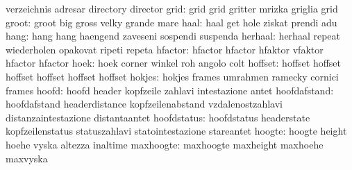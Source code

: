                            verzeichnis               adresar
                           directory                 director
                     grid: grid                      grid
                           gritter                   mrizka
                           griglia                   grid
                    groot: groot                     big
                           gross                     velky
                           grande                    mare
                     haal: haal                      get
                           hole                      ziskat
                           prendi                    adu
                     hang: hang                      hang
                           haengend                  zaveseni
                           sospendi                  suspenda
                  herhaal: herhaal                   repeat
                           wiederholen               opakovat
                           ripeti                    repeta
                  hfactor: hfactor                   hfactor
                           hfaktor                   vfaktor
                           hfactor                   hfactor  %
                     hoek: hoek                      corner
                           winkel                    roh
                           angolo                    colt
                  hoffset: hoffset                   hoffset
                           hoffset                   hoffset
                           hoffset                   hoffset %
                   hokjes: hokjes                    frames
                           umrahmen                  ramecky
                           cornici                   frames
                    hoofd: hoofd                     header
                           kopfzeile                 zahlavi
                           intestazione              antet
             hoofdafstand: hoofdafstand              headerdistance
                           kopfzeilenabstand         vzdalenostzahlavi
                           distanzaintestazione      distantaantet
              hoofdstatus: hoofdstatus               headerstate
                           kopfzeilenstatus          statuszahlavi
                           statointestazione         stareantet
                   hoogte: hoogte                    height
                           hoehe                     vyska
                           altezza                   inaltime
                maxhoogte: maxhoogte                 maxheight
                           maxhoehe                  maxvyska
